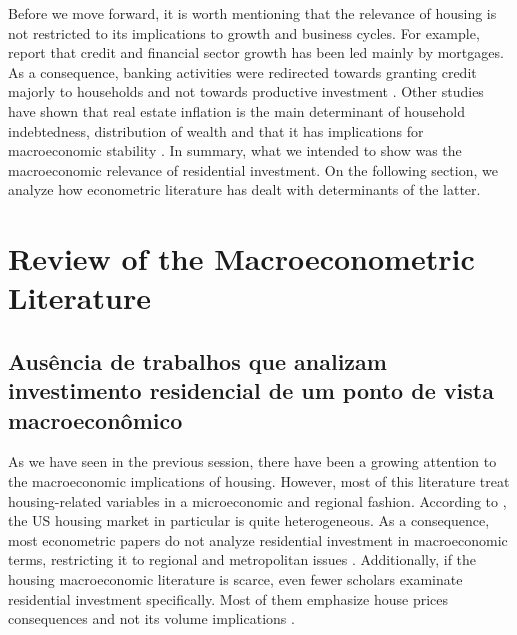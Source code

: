\documentclass[12pt, a4paper]{article}
\begin{document}
Before we move forward, it is worth mentioning that the relevance of housing is not restricted to its implications to growth and business cycles.
For example, \textcite{jorda_great_2016} report that credit and financial sector growth has been led mainly by mortgages. 
As a consequence, banking activities were redirected towards granting credit majorly to households and not towards productive investment \cites{erturk_banks_2007}{kohl_more_2018}.
Other studies have shown that real estate inflation is the main determinant of household indebtedness, distribution of wealth and that it has implications for macroeconomic stability \cites{ryoo_household_2015}{stockhammer_debt-driven_2016}{barnes_private_2016}{johnston_global_2017}{mian_household_2017}{anderson_politics_2020}{fuller_housing_2020}. 
In summary, what we intended to show was the macroeconomic relevance of residential investment.
On the following section, we analyze how econometric literature has dealt with determinants of the latter.
\section{Review of the Macroeconometric Literature}
\label{sec:org01ee9bb}
\label{sec:empirical_review}
\subsection{Ausência de trabalhos que analizam investimento residencial de um ponto de vista macroeconômico}
\label{sec:orgaad53cb}
As we have seen in the previous session, there have been a growing attention to the macroeconomic implications of housing.
However, most of this literature treat housing-related variables in a microeconomic and regional fashion.
According to \textcite{arestis_u.s._2008}, the US housing market in particular is quite heterogeneous.
As a consequence, most econometric papers do not analyze residential investment in macroeconomic terms, restricting it to regional and metropolitan issues \cite{arestis_u.s._2008}.
Additionally, if the housing macroeconomic literature is scarce, even fewer scholars examinate residential investment specifically.
Most of them emphasize house prices consequences and not its volume implications \cites{arestis_residential_2015}{perez_Montiel_2021}.
\end{document}
